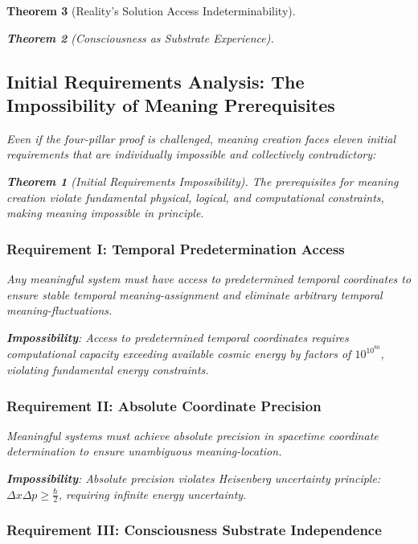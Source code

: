 \documentclass[12pt,a4paper]{article}
\newtheorem{theorem}{Theorem}[section]
\theoremstyle{remark}
\begin{document}
\begin{theorem}[Reality's Solution Access Indeterminability]
\begin{theorem}[Consciousness as Substrate Experience]
\subsection{Initial Requirements Analysis: The Impossibility of Meaning Prerequisites}

Even if the four-pillar proof is challenged, meaning creation faces eleven initial requirements that are individually impossible and collectively contradictory:

\begin{theorem}[Initial Requirements Impossibility]
The prerequisites for meaning creation violate fundamental physical, logical, and computational constraints, making meaning impossible in principle.
\end{theorem}

\subsubsection{Requirement I: Temporal Predetermination Access}

\begin{requirement}
Any meaningful system must have access to predetermined temporal coordinates to ensure stable temporal meaning-assignment and eliminate arbitrary temporal meaning-fluctuations.
\end{requirement}

\textbf{Impossibility}: Access to predetermined temporal coordinates requires computational capacity exceeding available cosmic energy by factors of $10^{10^{80}}$, violating fundamental energy constraints.

\subsubsection{Requirement II: Absolute Coordinate Precision}

\begin{requirement}
Meaningful systems must achieve absolute precision in spacetime coordinate determination to ensure unambiguous meaning-location.
\end{requirement}

\textbf{Impossibility}: Absolute precision violates Heisenberg uncertainty principle: $\Delta x \Delta p \geq \frac{\hbar}{2}$, requiring infinite energy uncertainty.

\subsubsection{Requirement III: Consciousness Substrate Independence}


\end{theorem}
\end{theorem}
\end{document}
